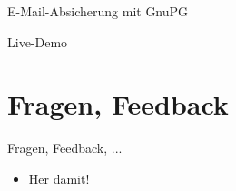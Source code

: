   \begin{frame}{E-Mail-Absicherung mit GnuPG}
    \begin{centering}
      \Huge Live-Demo
    \end{centering}
  \end{frame}

\section{Fragen, Feedback}
  \begin{frame}{Fragen, Feedback, ...}
    \begin{itemize}
      \item{Her damit!}
    \end{itemize}
  \end{frame}
